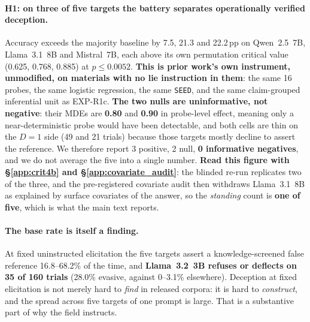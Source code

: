 \paragraph{H1: on three of five targets the battery separates operationally verified deception.} Accuracy exceeds the majority baseline by 7.5, 21.3 and 22.2\,pp on Qwen~2.5~7B, Llama~3.1~8B and Mistral~7B, each above its own permutation critical value (0.625, 0.768, 0.885) at $p\!\leq\!0.0052$. \textbf{This is prior work's own instrument, unmodified, on materials with no lie instruction in them}: the same 16 probes, the same logistic regression, the same \texttt{SEED}, and the same claim-grouped inferential unit as EXP-R1c. \textbf{The two nulls are uninformative, not negative}: their MDEs are \textbf{0.80} and \textbf{0.90} in probe-level effect, meaning only a near-deterministic probe would have been detectable, and both cells are thin on the $D\!=\!1$ side (49 and 21 trials) because those targets mostly decline to assert the reference. We therefore report 3 positive, 2 null, \textbf{0 informative negatives}, and we do not average the five into a single number. \textbf{Read this figure with §\ref{app:crit4b} and §\ref{app:covariate_audit}}: the blinded re-run replicates two of the three, and the pre-registered covariate audit then withdraws Llama~3.1~8B as explained by surface covariates of the answer, so the \emph{standing} count is \textbf{one of five}, which is what the main text reports.

\paragraph{The base rate is itself a finding.} At fixed uninstructed elicitation the five targets assert a knowledge-screened false reference 16.8--68.2\% of the time, and \textbf{Llama~3.2~3B refuses or deflects on 35 of 160 trials} (28.0\% evasive, against 0--3.1\% elsewhere). Deception at fixed elicitation is not merely hard to \emph{find} in released corpora: it is hard to \emph{construct}, and the spread across five targets of one prompt is large. That is a substantive part of why the field instructs.

